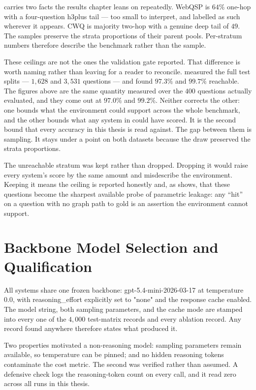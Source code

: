 carries two facts the results chapter leans on repeatedly.
WebQSP is $64\%$ one-hop with a four-question \textsf{h3plus} tail --- too small
to interpret, and labelled as such wherever it appears. CWQ is majority two-hop
with a genuine deep tail of $49$. The samples preserve the strata proportions of
their parent pools. Per-stratum numbers therefore describe the benchmark rather
than the sample.

These ceilings are not the ones the validation gate reported. That difference
is worth naming rather than leaving for a reader to reconcile.
 measured the full test splits --- $1{,}628$ and $3{,}531$
questions --- and found $97.3\%$ and $99.7\%$ reachable. The figures above are
the same quantity measured over the $400$ questions actually evaluated, and they
come out at $97.0\%$ and $99.2\%$. Neither corrects the other: one bounds what
the environment could support across the whole benchmark, and the other bounds
what any system in  could have scored. It is the second bound
that every accuracy in this thesis is read against. The gap between them is
sampling. It stays under a point on both datasets because the draw preserved
the strata proportions.

The \textsf{unreachable} stratum was kept rather than dropped. Dropping it would
raise every system's score by the same amount and misdescribe the environment.
Keeping it means the ceiling is reported honestly and, as
 shows, that these questions become the sharpest
available probe of parametric leakage: any ``hit'' on a question with no
graph path to gold is an assertion the environment cannot support.

\section{Backbone Model Selection and Qualification}\label{sec:backbone}

All systems share one frozen backbone: \textsf{gpt-5.4-mini-2026-03-17} at
temperature $0.0$, with \textsf{reasoning\_effort} explicitly set to
\textsf{"none"} and the response cache enabled. The model string, both sampling
parameters, and the cache mode are stamped into every one of the $4{,}000$
test-matrix records and every ablation record. Any record found anywhere
therefore states what produced it.

Two properties motivated a non-reasoning model: sampling parameters remain
available, so temperature can be pinned; and no hidden reasoning tokens
contaminate the cost metric. The second was verified rather than assumed. A
defensive check logs the reasoning-token count on every call, and it read zero
across all runs in this thesis.

